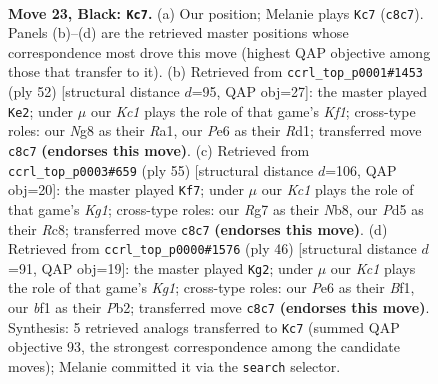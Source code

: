 \documentclass[11pt]{article}
\begin{document}
\clearpage

\begin{figure}[p]\centering
\begin{subfigure}{0.46\textwidth}\centering
\resizebox{\linewidth}{!}{%
\newchessgame
\chessboard[
  setfen={2krbbn1/p5r1/1p2p1p1/nP1pP1Pp/P2P1P2/5K2/3N4/RNB2B1R b - - 1 23},
  showmover=false,
  pgfstyle=straightmove, color=movearrow, markmove={c8-c7}
]}
\caption{}
\end{subfigure}\hfill
\begin{subfigure}{0.46\textwidth}\centering
\resizebox{\linewidth}{!}{%
\newchessgame
\chessboard[
  setfen={3r2k1/1r2bp2/p2ppn1p/2p3p1/1nP3P1/1PN1P1BP/1P1N1P2/R2R1K2 w - - 0 27},
  showmover=false,
  pgfstyle=straightmove, color=movearrow, markmove={f1-e2}
]}
\caption{}
\end{subfigure}
\\[4pt]
\begin{subfigure}{0.46\textwidth}\centering
\resizebox{\linewidth}{!}{%
\newchessgame
\chessboard[
  setfen={1nr2rk1/4b2p/p3pppP/1p1n2P1/3P4/1P3N2/R2B1PB1/1R4K1 b - - 0 28},
  showmover=false,
  pgfstyle=straightmove, color=movearrow, markmove={g8-f7}
]}
\caption{}
\end{subfigure}\hfill
\begin{subfigure}{0.46\textwidth}\centering
\resizebox{\linewidth}{!}{%
\newchessgame
\chessboard[
  setfen={r7/2rnp1bk/2pp1np1/5p1p/p1NP3P/5PP1/PPR1PB2/3R1BK1 w - - 6 24},
  showmover=false,
  pgfstyle=straightmove, color=movearrow, markmove={g1-g2}
]}
\caption{}
\end{subfigure}
\caption{\textbf{Move 23, Black: \texttt{Kc7}.} (a) Our position; Melanie plays \texttt{Kc7} (\texttt{c8c7}). Panels (b)--(d) are the retrieved master positions whose correspondence most drove this move (highest QAP objective among those that transfer to it). (b) Retrieved from \texttt{ccrl\_top\_p0001\#1453} (ply 52) [structural distance $d$=95, QAP obj=27]: the master played \texttt{Ke2}; under $\mu$ our \emph{Kc1} plays the role of that game's \emph{Kf1}; cross-type roles: our \emph{N}g8 as their \emph{R}a1, our \emph{P}e6 as their \emph{R}d1; transferred move \texttt{c8c7} \textbf{(endorses this move)}. (c) Retrieved from \texttt{ccrl\_top\_p0003\#659} (ply 55) [structural distance $d$=106, QAP obj=20]: the master played \texttt{Kf7}; under $\mu$ our \emph{Kc1} plays the role of that game's \emph{Kg1}; cross-type roles: our \emph{R}g7 as their \emph{N}b8, our \emph{P}d5 as their \emph{R}c8; transferred move \texttt{c8c7} \textbf{(endorses this move)}. (d) Retrieved from \texttt{ccrl\_top\_p0000\#1576} (ply 46) [structural distance $d$=91, QAP obj=19]: the master played \texttt{Kg2}; under $\mu$ our \emph{Kc1} plays the role of that game's \emph{Kg1}; cross-type roles: our \emph{P}e6 as their \emph{B}f1, our \emph{b}f1 as their \emph{P}b2; transferred move \texttt{c8c7} \textbf{(endorses this move)}. Synthesis: 5 retrieved analogs transferred to \texttt{Kc7} (summed QAP objective 93, the strongest correspondence among the candidate moves); Melanie committed it via the \texttt{search} selector.}
\label{fig:thought-m45}
\end{figure}
\end{document}
